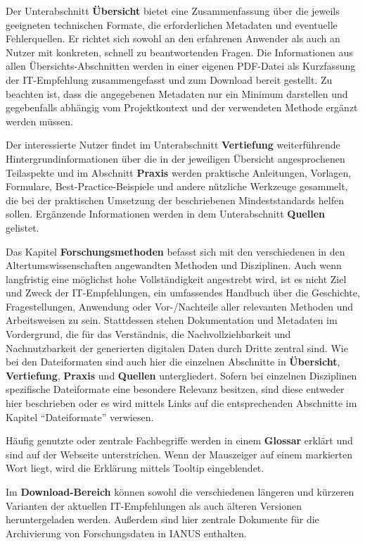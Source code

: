 Der Unterabschnitt \textbf{Übersicht} bietet eine Zusammenfassung über die jeweils geeigneten technischen Formate, die erforderlichen Metadaten und eventuelle Fehlerquellen. Er richtet sich sowohl an den erfahrenen Anwender als auch an Nutzer mit konkreten, schnell zu beantwortenden Fragen. Die Informationen aus allen Übersichts-Abschnitten werden in einer eigenen PDF-Datei als Kurzfassung der IT-Empfehlung zusammengefasst und zum Download bereit gestellt. Zu beachten ist, dass die angegebenen Metadaten nur ein Minimum darstellen und gegebenfalls abhängig vom Projektkontext und der verwendeten Methode ergänzt werden müssen.

Der interessierte Nutzer findet im Unterabschnitt \textbf{Vertiefung} weiterführende Hintergrundinformationen über die in der jeweiligen Übersicht angesprochenen Teilaspekte und im Abschnitt \textbf{Praxis} werden praktische Anleitungen, Vorlagen, Formulare, Best-Practice-Beispiele und andere nützliche Werkzeuge gesammelt, die bei der praktischen Umsetzung der beschriebenen Mindeststandards helfen sollen. Ergänzende Informationen werden in dem Unterabschnitt \textbf{Quellen} gelistet.

Das Kapitel \textbf{Forschungsmethoden} befasst sich mit den verschiedenen in den Altertumswissenschaften angewandten Methoden und Disziplinen. Auch wenn langfristig eine möglichst hohe Vollständigkeit angestrebt wird, ist es nicht Ziel und Zweck der IT-Empfehlungen, ein umfassendes Handbuch über die Geschichte, Fragestellungen, Anwendung oder Vor-/Nachteile aller relevanten Methoden und Arbeitsweisen zu sein. Stattdessen stehen Dokumentation und Metadaten im Vordergrund, die für das Verständnis, die Nachvollziehbarkeit und Nachnutzbarkeit der generierten digitalen Daten durch Dritte zentral sind. Wie bei den Dateiformaten sind auch hier die einzelnen Abschnitte in \textbf{Übersicht}, \textbf{Vertiefung}, \textbf{Praxis} und \textbf{Quellen} untergliedert. Sofern bei einzelnen Disziplinen spezifische Dateiformate eine besondere Relevanz besitzen, sind diese entweder hier beschrieben oder es wird mittels Links auf die entsprechenden Abschnitte im Kapitel "`Dateiformate"' verwiesen.

Häufig genutzte oder zentrale Fachbegriffe werden in einem \textbf{Glossar} erklärt und sind auf der Webseite unterstrichen. Wenn der Mauszeiger auf einem markierten Wort liegt, wird die Erklärung mittels Tooltip eingeblendet.

Im \textbf{Download-Bereich} können sowohl die verschiedenen längeren und kürzeren Varianten der aktuellen IT-Empfehlungen als auch älteren Versionen heruntergeladen werden. Außerdem sind hier zentrale Dokumente für die Archivierung von Forschungsdaten in IANUS enthalten. 

